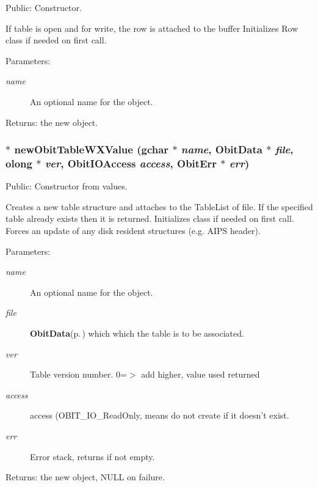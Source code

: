Public: Constructor. 

If table is open and for write, the row is attached to the buffer Initializes Row class if needed on first call. \begin{Desc}
\item[Parameters:]
\begin{description}
\item[{\em name}]An optional name for the object. \end{description}
\end{Desc}
\begin{Desc}
\item[Returns:]the new object. \end{Desc}
\subsubsection{$\ast$ new\-Obit\-Table\-WXValue (gchar $\ast$ {\em name}, {\bf Obit\-Data} $\ast$ {\em file}, {\bf olong} $\ast$ {\em ver}, Obit\-IOAccess {\em access}, {\bf Obit\-Err} $\ast$ {\em err})}\label{ObitTableWX_8h_a12}


Public: Constructor from values. 

Creates a new table structure and attaches to the Table\-List of file. If the specified table already exists then it is returned. Initializes class if needed on first call. Forces an update of any disk resident structures (e.g. AIPS header). \begin{Desc}
\item[Parameters:]
\begin{description}
\item[{\em name}]An optional name for the object. \item[{\em file}]{\bf Obit\-Data}{\rm (p.\,\pageref{structObitData})} which which the table is to be associated. \item[{\em ver}]Table version number. 0=$>$ add higher, value used returned \item[{\em access}]access (OBIT\_\-IO\_\-Read\-Only, means do not create if it doesn't exist. \item[{\em err}]Error stack, returns if not empty. \end{description}
\end{Desc}
\begin{Desc}
\item[Returns:]the new object, NULL on failure. \end{Desc}
